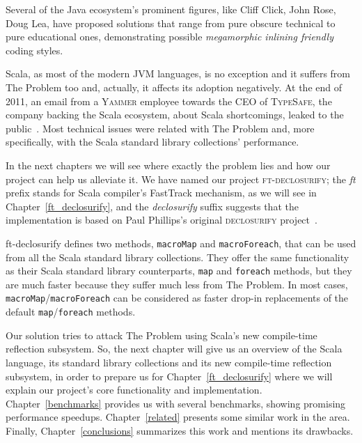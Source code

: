 Several of the Java ecosystem's prominent figures, like Cliff Click, John Rose,
Doug Lea, have proposed solutions that range from pure obscure technical to pure
educational ones, demonstrating possible \emph{megamorphic inlining friendly}
coding styles.

Scala, as most of the modern JVM languages, is no exception and it suffers from
The Problem too and, actually, it affects its adoption negatively. At the end of
2011, an email from a \textsc{Yammer} employee towards the CEO of \textsc{TypeSafe}, the company
backing the Scala ecosystem, about Scala shortcomings, leaked to the public~\cite{infoq:Yammer}. Most technical issues were
related with The Problem and, more specifically, with the Scala standard
library collections' performance. 

In the next chapters we will see where exactly the problem lies and how
our project can help us alleviate it. We have named our project
\textsc{ft-declosurify}; the \emph{ft} prefix stands for Scala compiler's FastTrack
mechanism, as we will see in Chapter~\ref{ft_declosurify}, and the \emph{declosurify} suffix suggests that
the implementation is based on Paul Phillips's original \textsc{declosurify} project~\cite{paulp:declosurify}. 

ft-declosurify defines two methods, \texttt{macroMap} and \texttt{macroForeach}, that can be used
from all the Scala standard library collections. They offer the same
functionality as their Scala standard library counterparts, \texttt{map} and \texttt{foreach}
methods, but they are much faster because they suffer much less from The
Problem. In most cases, \texttt{macroMap}/\texttt{macroForeach} can be considered as faster
drop-in replacements of the default \texttt{map}/\texttt{foreach} methods.

Our solution tries to attack The Problem using Scala's new compile-time
reflection subsystem. So, the next chapter will give us an overview of the Scala language, its standard library collections and its new
compile-time reflection subsystem, in order to prepare us for Chapter~\ref{ft_declosurify}
where we will explain our project's core functionality and implementation.
Chapter~\ref{benchmarks} provides us with several benchmarks, showing promising performance
speedups. Chapter~\ref{related} presents some similar work in the area. Finally, Chapter~\ref{conclusions}
summarizes this work and mentions its drawbacks.